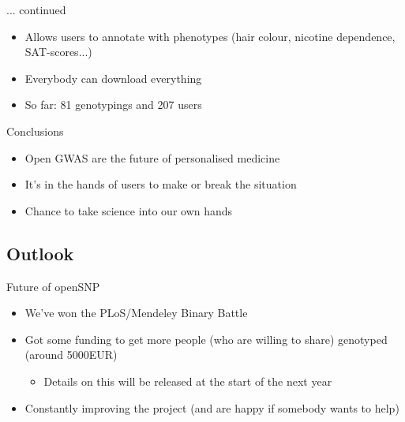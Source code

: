 \documentclass[12pt,a4paper]{beamer}
\begin{document}
\begin{frame}{... continued}
\begin{itemize}
\item Allows users to annotate with phenotypes (hair colour, nicotine dependence, SAT-scores...)
\pause \item Everybody can download everything
\pause \item So far: 81 genotypings and 207 users %
\end{itemize}
\end{frame}

\begin{frame}{Conclusions}
\begin{itemize}
\item Open GWAS are the future of personalised medicine
\pause \item It's in the hands of users to make or break the situation
\pause \item Chance to take science into our own hands %
\end{itemize}
\end{frame}

\subsection{Outlook}
\begin{frame}{Future of openSNP}
\begin{itemize}
\item We've won the PLoS/Mendeley Binary Battle
\pause \item Got some funding to get more people (who are willing to share) genotyped (around 5000EUR)
\begin{itemize}
\pause \item Details on this will be released at the start of the next year
\end{itemize} 
\pause \item Constantly improving the project (and are happy if somebody wants to help)
\end{itemize}
\end{frame}
\end{document}
